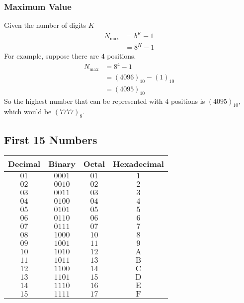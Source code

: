 \documentclass[\main/notes.tex]{subfiles}
\begin{document}
				\subsubsection{Maximum Value}
					Given the number of digits $K$
					\begin{align*}
						N_{\max} &= b^{K} - 1\\
						&= 8^{K} - 1
					\end{align*}
					For example, suppose there are $4$ positions.
					\begin{align*}
						N_{\max} &= 8^{4} - 1\\
						&= (4096)_{10} - (1)_{10}\\
						&= (4095)_{10}
					\end{align*}
					So the highest number that can be represented with $4$ positions is $(4095)_{10}$, which would be $(7777)_{8}$.
			\subsection{First 15 Numbers}
			\begin{table}[h]
				\centering
				\begin{tabular}{cccc}
					\toprule
					Decimal & Binary & Octal & Hexadecimal\\
					\midrule
					$01$ & $0001$ & $01$ & $1$\\
					$02$ & $0010$ & $02$ & $2$\\
					$03$ & $0011$ & $03$ & $3$\\
					$04$ & $0100$ & $04$ & $4$\\
					$05$ & $0101$ & $05$ & $5$\\
					$06$ & $0110$ & $06$ & $6$\\
					$07$ & $0111$ & $07$ & $7$\\
					$08$ & $1000$ & $10$ & $8$\\
					$09$ & $1001$ & $11$ & $9$\\
					$10$ & $1010$ & $12$ & $\mathrm{A}$\\
					$11$ & $1011$ & $13$ & $\mathrm{B}$\\
					$12$ & $1100$ & $14$ & $\mathrm{C}$\\
					$13$ & $1101$ & $15$ & $\mathrm{D}$\\
					$14$ & $1110$ & $16$ & $\mathrm{E}$\\
					$15$ & $1111$ & $17$ & $\mathrm{F}$\\
					\bottomrule
				\end{tabular}
			\end{table}
		\pagebreak
\end{document}
